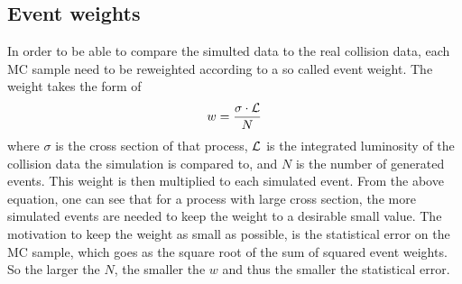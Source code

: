 \subsection*{Event weights}
\noindent
\justify
In order to be able to compare the simulted data to the real collision data, each MC sample need to be reweighted according to a so called event weight. The weight takes the form of
\begin{equation}
w=\frac{\sigma\cdot\cal{L}}{N}
\end{equation}
where $\sigma$ is the cross section of that process, $\cal{L}$ is the integrated luminosity of the collision data the simulation is compared to, and $N$ is the number of generated events. 
This weight is then multiplied to each simulated event. 
From the above equation, one can see that for a process with large cross section, the more simulated events are needed to keep the weight to a desirable small value. 
The motivation to keep the weight as small as possible, is the statistical error on the MC sample, which goes as the square root of the sum of squared event weights. 
So the larger the $N$, the smaller the $w$ and thus the smaller the statistical error. 
